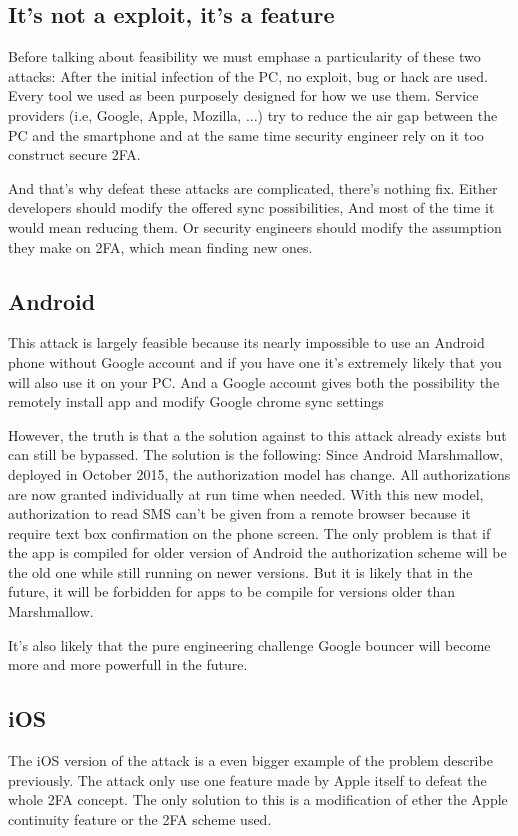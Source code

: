 \documentclass[11pt, a4paper,twocolumn]{article}
\begin{document}
\subsection{It's not a exploit, it's a feature}
Before talking about feasibility we must emphase a particularity of these two attacks: After the initial infection of the PC, no exploit, bug or hack are used. Every tool we used as been purposely designed for how we use them. Service providers (i.e, Google, Apple, Mozilla, ...) try to reduce the air gap between the PC and the smartphone and at the same time security engineer rely on it too construct secure 2FA.

And that's why defeat  these attacks are complicated, there's nothing fix. Either developers should modify the offered sync possibilities, And most of the time it would mean reducing them. Or security engineers should modify the assumption they make on 2FA, which mean finding new ones. 
\subsection{Android}

This attack is largely feasible because its nearly impossible to use an Android phone without Google account and if you have one it's extremely likely that you will also use it on your PC. And a Google account gives both the possibility the remotely install app and modify Google chrome sync settings

However, the truth is that a the solution against to this attack already exists but can still be bypassed. The solution is the following: Since Android Marshmallow, deployed in October 2015, the authorization model has change. All authorizations are now granted individually at run time when needed. With this new model, authorization to read SMS can't be given from a remote browser because  it require text box confirmation on the phone screen. The only problem is that if the app is compiled for older version of Android the authorization scheme will be the old one while still running on newer versions. But it is likely that in the future, it will be forbidden for apps to be compile for versions older than Marshmallow.

It's also likely that the pure engineering challenge Google bouncer will become more and more powerfull in the future. 

\subsection{iOS}
The iOS version of the attack is a even bigger example of the problem describe previously. The attack only use one feature made by Apple itself to defeat the whole 2FA concept. The only solution to this is a modification of ether the Apple continuity feature or the 2FA scheme used. 
\end{document}
